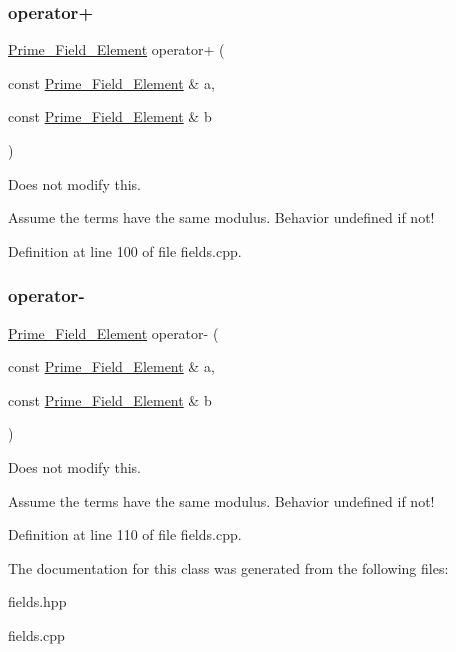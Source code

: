 \subsubsection{\texorpdfstring{operator+}{operator+}}
{\footnotesize\ttfamily \hyperlink{class_prime___field___element}{Prime\+\_\+\+Field\+\_\+\+Element} operator+ (\begin{DoxyParamCaption}\item[{const \hyperlink{class_prime___field___element}{Prime\+\_\+\+Field\+\_\+\+Element} \&}]{a,  }\item[{const \hyperlink{class_prime___field___element}{Prime\+\_\+\+Field\+\_\+\+Element} \&}]{b }\end{DoxyParamCaption})\hspace{0.3cm}{\ttfamily [friend]}}



Does not modify {\ttfamily this}. 

Assume the terms have the same modulus. Behavior undefined if not! 

Definition at line 100 of file fields.\+cpp.

\mbox{\label{class_prime___field___element_aa87409f200d39343529ab443cd496b31}} 
\subsubsection{\texorpdfstring{operator-\/}{operator-}}
{\footnotesize\ttfamily \hyperlink{class_prime___field___element}{Prime\+\_\+\+Field\+\_\+\+Element} operator-\/ (\begin{DoxyParamCaption}\item[{const \hyperlink{class_prime___field___element}{Prime\+\_\+\+Field\+\_\+\+Element} \&}]{a,  }\item[{const \hyperlink{class_prime___field___element}{Prime\+\_\+\+Field\+\_\+\+Element} \&}]{b }\end{DoxyParamCaption})\hspace{0.3cm}{\ttfamily [friend]}}



Does not modify {\ttfamily this}. 

Assume the terms have the same modulus. Behavior undefined if not! 

Definition at line 110 of file fields.\+cpp.



The documentation for this class was generated from the following files\+:\begin{DoxyCompactItemize}
\item 
fields.\+hpp\item 
fields.\+cpp\end{DoxyCompactItemize}
